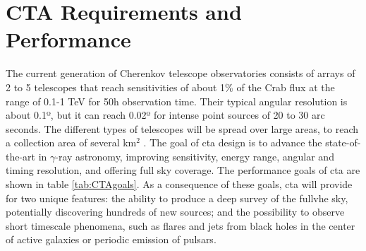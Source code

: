 \documentclass[main.tex]{subfiles}
\begin{document}
\section{CTA Requirements and Performance} \label{sec:ctaperformance}

The current generation of Cherenkov telescope observatories consists of arrays of 2 to 5 telescopes that reach sensitivities of about 1\% of the Crab flux at the range of 0.1-1 TeV for 50h observation time. Their typical angular resolution is about 0.1º, but it can reach 0.02º for intense point sources of 20 to 30 arc seconds. The different types of telescopes will be spread over large areas, to reach a collection area of several km$^2$ \cite{CTAconcept}.
The goal of \gls{cta} design is to advance the state-of-the-art in $\gamma$-ray astronomy, improving sensitivity, energy range, angular and timing resolution, and offering full sky coverage. The performance goals of \gls{cta} are shown in table \ref{tab:CTAgoals}. As a consequence of these goals, \gls{cta} will provide for two unique features: the ability to produce a deep survey of the full\gls{vhe} sky, potentially discovering hundreds of new sources; and the possibility to observe short timescale phenomena, such as flares and jets from black holes in the center of active galaxies or periodic emission of pulsars.
\end{document}
